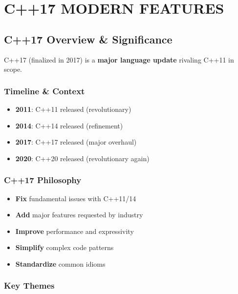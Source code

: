 \hypertarget{c17-modern-features}{%
\chapter{C++17 MODERN FEATURES}\label{c17-modern-features}}

\hypertarget{c17-overview-significance}{%
\section{C++17 Overview \&
Significance}\label{c17-overview-significance}}

C++17 (finalized in 2017) is a \textbf{major language update} rivaling
C++11 in scope.

\hypertarget{timeline-context}{%
\subsection{Timeline \& Context}\label{timeline-context}}

\begin{itemize}
\tightlist
\item
  \textbf{2011}: C++11 released (revolutionary)
\item
  \textbf{2014}: C++14 released (refinement)
\item
  \textbf{2017}: C++17 released (major overhaul)
\item
  \textbf{2020}: C++20 released (revolutionary again)
\end{itemize}

\hypertarget{c17-philosophy}{%
\subsection{C++17 Philosophy}\label{c17-philosophy}}

\begin{itemize}
\tightlist
\item
  \textbf{Fix} fundamental issues with C++11/14
\item
  \textbf{Add} major features requested by industry
\item
  \textbf{Improve} performance and expressivity
\item
  \textbf{Simplify} complex code patterns
\item
  \textbf{Standardize} common idioms
\end{itemize}

\hypertarget{key-themes}{%
\subsection{Key Themes}\label{key-themes}}

